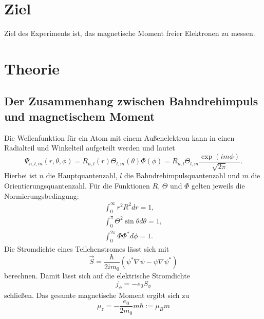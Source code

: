 \section{Ziel}
Ziel des Experiments ist, das magnetische Moment freier Elektronen zu messen.

\section{Theorie}
\subsection{Der Zusammenhang zwischen Bahndrehimpuls und magnetischem Moment}
Die Wellenfunktion für ein Atom mit einem Außenelektron kann in einen Radialteil und Winkelteil aufgeteilt werden und lautet
\begin{equation*}
  \Psi_{n,l,m}(r,\theta,\phi) = R_{n,l}(r)\Theta_{l,m}(\theta)\Phi(\phi) = R_{n,l}\Theta_{l,m}\frac{\exp(im\phi)}{\sqrt{2\pi}}.
\end{equation*}
Hierbei ist $n$ die Hauptquantenzahl, $l$ die Bahndrehimpulsquantenzahl und $m$ die Orientierungsquantenzahl.
Für die Funktionen $R$, $\Theta$ und $\Phi$ gelten jeweils die Normierungsbedingung:
\begin{gather*}
  \int_0^{\infty}r^2R^2dr = 1, \\
  \int_0^{\pi}\Theta^2\sin{\theta}d\theta = 1, \\
  \int_0^{2\pi}\Phi\Phi^*d\phi = 1.
\end{gather*}
Die Stromdichte eines Teilchenstromes lässt sich mit
\begin{equation*}
  \vec{S} = \frac{\hbar}{2im_0}(\psi^*\nabla\psi - \psi\nabla\psi^*)
\end{equation*}
berechnen.
Damit lässt sich auf die elektrische Stromdichte
\begin{equation*}
  j_{\phi} = -e_0S_{\phi}
\end{equation*}
schließen.
Das gesamte magnetische Moment ergibt sich zu
\begin{equation}
  \mu_z = -\frac{e_0}{2m_0}m\hbar := \mu_Bm
\end{equation}
